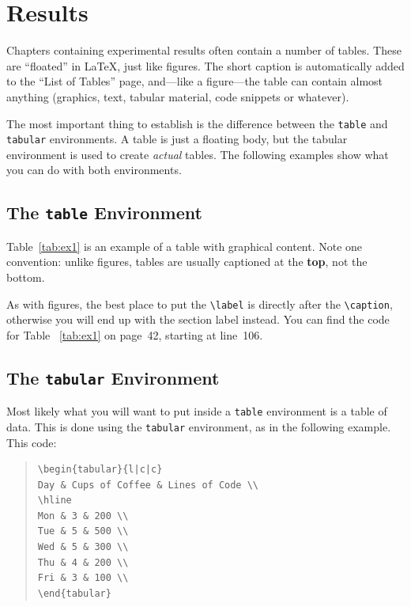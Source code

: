 \chapter{Results}
\label{chap:tables}

Chapters containing experimental results often contain a number of
tables.  These are ``floated'' in \LaTeX, just like figures.  The
short caption is automatically added to the ``List of Tables'' page,
and---like a figure---the table can contain almost anything
(graphics, text, tabular material, code snippets or whatever).

The most important thing to establish is the difference between
the {\tt table} and {\tt tabular} environments.  A table is just a
floating body, but the tabular environment is used to create
{\em actual} tables.  The following examples show what you can do with
both environments.

\section{The {\tt table} Environment}

Table~\ref{tab:ex1} is an example of a table with graphical content.
Note one convention:  unlike figures, tables are usually captioned at
the {\bf top}, not the bottom.  

As with figures, the best place to put the \verb|\label| is directly
after the \verb|\caption|, otherwise you will end up with the section
label instead.  You can find the code for Table ~\ref{tab:ex1} on page~42,
starting at line~106.

\section{The {\tt tabular} Environment}

Most likely what you will want to put inside a {\tt table} environment
is a table of data.  This is done using the {\tt tabular} environment,
as in the following example.  This code:

\linespread{1}\small
\begin{quote}
\begin{verbatim}
\begin{tabular}{l|c|c}
Day & Cups of Coffee & Lines of Code \\
\hline
Mon & 3 & 200 \\
Tue & 5 & 500 \\
Wed & 5 & 300 \\
Thu & 4 & 200 \\
Fri & 3 & 100 \\
\end{tabular}
\end{verbatim}
\end{quote}
\linespread{1.3}\normalsize

